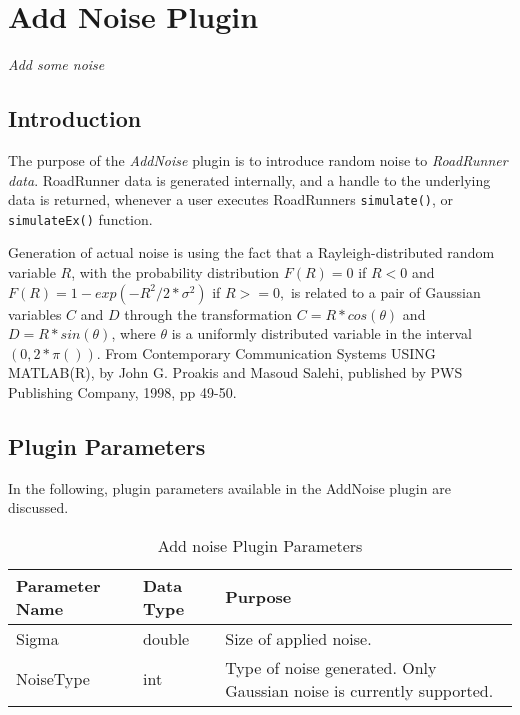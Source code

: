 \chapter{Add Noise Plugin}
\emph{Add some noise}
\section{Introduction}
The purpose of the \emph{AddNoise} plugin is to introduce random noise to \emph{RoadRunner data}. RoadRunner data is generated internally, and a handle to the underlying data is returned, whenever a user executes RoadRunners \verb|simulate()|, or \verb|simulateEx()| function. 

Generation of actual noise is using the fact that a Rayleigh-distributed random variable $R$, with
the probability distribution $F(R) = 0$ if $R < 0$ and $F(R) = 1 - exp(-R^2/2*\sigma^2)$ if $R >= 0, $
is related to a pair of Gaussian variables $C$ and $D$ through the transformation $C = R * cos(\theta)$ and
$D = R * sin(\theta)$, where $\theta$ is a uniformly distributed variable
in the interval $(0, 2*\pi())$. From Contemporary Communication Systems
USING MATLAB(R), by John G. Proakis and Masoud Salehi, published by
PWS Publishing Company, 1998, pp 49-50. 

 
\section{Plugin Parameters}
In the following, plugin parameters available in the AddNoise plugin are discussed.

\begin{table}[ht]
\centering %
\begin{tabular}{l l p{7.5cm}} %

Parameter Name & Data Type & Purpose \\ [0.5ex] %
\hline %
Sigma         	& 	double & Size of applied noise. \\
NoiseType      	& 	int    & Type of noise generated. Only Gaussian noise is currently supported. \\

\hline %
\end{tabular}
\caption{Add noise Plugin Parameters} 
\label{table:AddNoisePluginParameters} 
\end{table}

